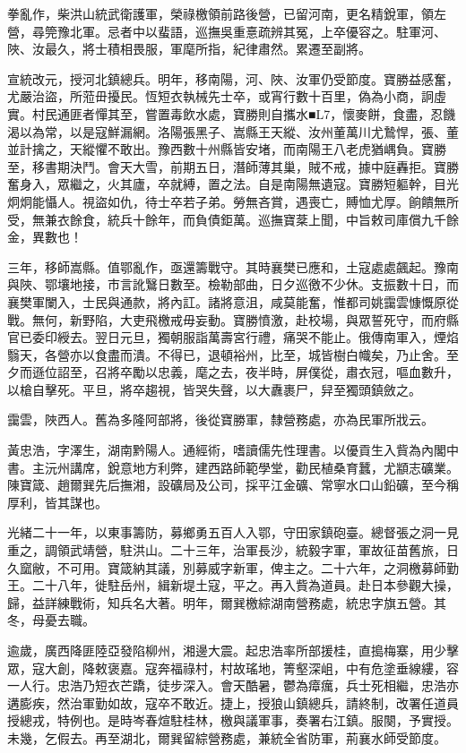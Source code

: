 \begin{pinyinscope}
拳亂作，柴洪山統武衛護軍，榮祿檄領前路後營，已留河南，更名精銳軍，領左營，尋筦豫北軍。忌者中以蜚語，巡撫吳重憙疏辨其冤，上卒優容之。駐軍河、陜、汝最久，將士積相畏服，軍麾所指，紀律肅然。累遷至副將。

宣統改元，授河北鎮總兵。明年，移南陽，河、陜、汝軍仍受節度。寶勝益感奮，尤嚴治盜，所蒞毌擾民。恆短衣執械先士卒，或宵行數十百里，偽為小商，詗虛實。村民通匪者憚其至，嘗置毒飲水處，寶勝則自攜水■L7，懷麥餅，食盡，忍饑渴以為常，以是寇鮮漏網。洛陽張黑子、嵩縣王天縱、汝州董萬川尤鷙悍，張、董並計擒之，天縱懼不敢出。豫西數十州縣皆安堵，而南陽王八老虎猶嵎負。寶勝至，移書期決鬥。會天大雪，前期五日，潛師薄其巢，賊不戒，據中庭轟拒。寶勝奮身入，眾繼之，火其廬，卒就縛，置之法。自是南陽無遺寇。寶勝短軀幹，目光炯炯能懾人。視盜如仇，待士卒若子弟。勞無吝賞，遇喪亡，賻恤尤厚。餉饋無所受，無兼衣餘食，統兵十餘年，而負債鉅萬。巡撫寶棻上聞，中旨敕司庫償九千餘金，異數也！

三年，移師嵩縣。值鄂亂作，亟還籌戰守。其時襄樊已應和，土寇處處飆起。豫南與陜、鄂壤地接，市言訛鷖日數至。檢勒部曲，日夕巡徼不少休。支振數十日，而襄樊軍闌入，士民與通款，將內訌。諸將意沮，咸莫能奮，惟都司姚靄雲慷慨原從戰。無何，新野陷，大吏飛檄戒毋妄動。寶勝憤激，赴校場，與眾誓死守，而府縣官已委印綬去。翌日元旦，獨朝服詣萬壽宮行禮，痛哭不能止。俄傳南軍入，煙焰翳天，各營亦以食盡而潰。不得已，退頓裕州，比至，城皆樹白幟矣，乃止舍。至夕而遜位詔至，召將卒勵以忠義，麾之去，夜半時，屏僕從，肅衣冠，嘔血數升，以槍自擊死。平旦，將卒趨視，皆哭失聲，以大纛裹尸，舁至獨頭鎮斂之。

靄雲，陜西人。舊為多隆阿部將，後從寶勝軍，隸營務處，亦為民軍所戕云。

黃忠浩，字澤生，湖南黔陽人。通經術，嗜讀儒先性理書。以優貢生入貲為內閣中書。主沅州講席，銳意地方利弊，建西路師範學堂，勸民植桑育蠶，尤顓志礦業。陳寶箴、趙爾巽先后撫湘，設礦局及公司，採平江金礦、常寧水口山鉛礦，至今稱厚利，皆其謀也。

光緒二十一年，以東事籌防，募鄉勇五百人入鄂，守田家鎮砲臺。總督張之洞一見重之，調領武靖營，駐洪山。二十三年，治軍長沙，統毅字軍，軍故征苗舊旅，日久窳敝，不可用。寶箴納其議，別募威字新軍，俾主之。二十六年，之洞檄募師勤王。二十八年，徙駐岳州，緝新堤土寇，平之。再入貲為道員。赴日本參觀大操，歸，益詳練戰術，知兵名大著。明年，爾巽檄綜湖南營務處，統忠字旗五營。其冬，母憂去職。

逾歲，廣西降匪陸亞發陷柳州，湘邊大震。起忠浩率所部援桂，直搗梅寨，用少擊眾，寇大創，降敕褒嘉。寇奔福祿村，村故瑤地，箐壑深岨，中有危塗垂線縷，容一人行。忠浩乃短衣芒蹻，徒步深入。會天酷暑，鬱為瘴癘，兵士死相繼，忠浩亦遘膨疾，然治軍勤如故，寇卒不敢近。捷上，授狼山鎮總兵，請終制，改署任道員授總戎，特例也。是時岑春煊駐桂林，檄與議軍事，奏署右江鎮。服闋，予實授。未幾，乞假去。再至湖北，爾巽留綜營務處，兼統全省防軍，荊襄水師受節度。


\end{pinyinscope}
